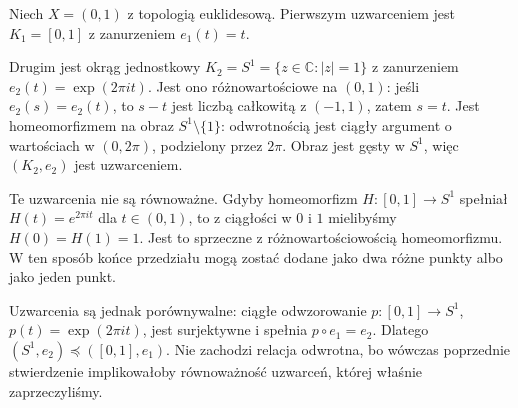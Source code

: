 \begin{przyklad}
\label{ex:topog-uzwarcenia-dwa-przedzialu}
Niech $X=(0,1)$ z topologią euklidesową.
Pierwszym uzwarceniem jest
$K_1=[0,1]$ z zanurzeniem
$e_1(t)=t$.

Drugim jest okrąg jednostkowy
$K_2=S^1=\{z\in\mathbb C:|z|=1\}$
z zanurzeniem
$e_2(t)=\exp(2\pi it)$.
Jest ono różnowartościowe na $(0,1)$:
jeśli $e_2(s)=e_2(t)$, to $s-t$
jest liczbą całkowitą z $(-1,1)$,
zatem $s=t$.
Jest homeomorfizmem na obraz
$S^1\setminus\{1\}$:
odwrotnością jest ciągły argument
o wartościach w $(0,2\pi)$,
podzielony przez $2\pi$.
Obraz jest gęsty w $S^1$,
więc $(K_2,e_2)$ jest uzwarceniem.

Te uzwarcenia nie są równoważne.
Gdyby homeomorfizm
$H\colon[0,1]\to S^1$ spełniał
$H(t)=e^{2\pi it}$ dla $t\in(0,1)$,
to z ciągłości w $0$ i $1$
mielibyśmy $H(0)=H(1)=1$.
Jest to sprzeczne z różnowartościowością
homeomorfizmu.
W ten sposób końce przedziału
mogą zostać dodane jako dwa
różne punkty albo jako jeden punkt.

Uzwarcenia są jednak porównywalne:
ciągłe odwzorowanie
$p\colon[0,1]\to S^1$,
$p(t)=\exp(2\pi it)$,
jest surjektywne i spełnia
$p\circ e_1=e_2$.
Dlatego
$(S^1,e_2)\preccurlyeq([0,1],e_1)$.
Nie zachodzi relacja odwrotna,
bo wówczas poprzednie stwierdzenie
implikowałoby równoważność uzwarceń,
której właśnie zaprzeczyliśmy.
\end{przyklad}

